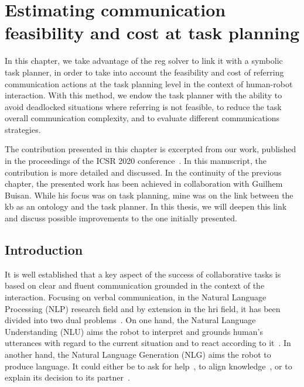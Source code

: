 \ifdefined{}
\else
\setcounter{chapter}{5} %
\dominitoc
\faketableofcontents
\fi

\chapter{Estimating communication feasibility and cost at task planning}
\label{chap:5}
\minitoc

In this chapter, we take advantage of the \acrshort{reg} solver to link it with a symbolic task planner, in order to take into account the feasibility and cost of referring communication actions at the task planning level in the context of human-robot interaction. With this method, we endow the task planner with the ability to avoid deadlocked situations where referring is not feasible, to reduce the task overall communication complexity, and to evaluate different communications strategies.

The contribution presented in this chapter is excerpted from our work, published in the proceedings of the ICSR 2020 conference~\cite{buisan_2020_human}. In this manuscript, the contribution is more detailed and discussed. In the continuity of the previous chapter, the presented work has been achieved in collaboration with Guilhem Buisan. While his focus was on task planning, mine was on the link between the \acrlong{kb} as an ontology and the task planner. In this thesis, we will deepen this link and discuss possible improvements to the one initially presented.

\section{Introduction}

It is well established that a key aspect of the success of collaborative tasks is based on clear and fluent communication grounded in the context of the interaction. Focusing on verbal communication, in the Natural Language Processing (NLP) research field and by extension in the \acrfull{hri} field, it has been divided into two dual problems~\cite{tellex_2020_robots}. On one hand, the Natural Language Understanding (NLU) aims the robot to interpret and grounds human's utterances with regard to the current situation and to react according to it~\cite{brawer_2018_situated}. In another hand, the Natural Language Generation (NLG) aims the robot to produce language. It could either be to ask for help~\cite{tellex_2014_asking}, to align knowledge~\cite{devin_2016_implemented}, or to explain its decision to its partner~\cite{roncone_2017_transparent}.

